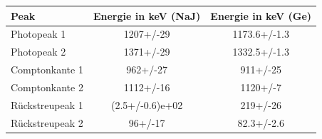 \begin{tabular}{lcc}
\toprule
           Peak & Energie in keV (NaJ) & Energie in keV (Ge) \\
\midrule
    Photopeak 1 &            1207+/-29 &        1173.6+/-1.3 \\
    Photopeak 2 &            1371+/-29 &        1332.5+/-1.3 \\
 Comptonkante 1 &             962+/-27 &            911+/-25 \\
 Comptonkante 2 &            1112+/-16 &            1120+/-7 \\
Rückstreupeak 1 &      (2.5+/-0.6)e+02 &            219+/-26 \\
Rückstreupeak 2 &              96+/-17 &          82.3+/-2.6 \\
\bottomrule
\end{tabular}
